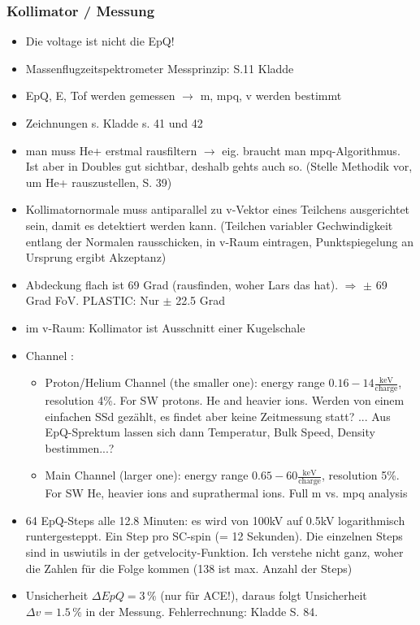 \documentclass[]{article}
\begin{document}
\subsubsection{Kollimator / Messung}
\begin{itemize}
	\item Die voltage ist nicht die EpQ!
	\item Massenflugzeitspektrometer Messprinzip: S.11 Kladde
	\item {EpQ, E, Tof} werden gemessen $\rightarrow$ {m, mpq, v} werden bestimmt
	\item Zeichnungen s. Kladde s. 41 und 42
	\item man muss He+ erstmal rausfiltern $\rightarrow$ eig. braucht man mpq-Algorithmus. Ist aber in Doubles gut sichtbar, deshalb gehts auch so. (Stelle Methodik vor, um He+ rauszustellen, S. 39)
	\item Kollimatornormale muss antiparallel zu v-Vektor eines Teilchens ausgerichtet sein, damit es detektiert werden kann. (Teilchen variabler Gechwindigkeit entlang der Normalen rausschicken, in v-Raum eintragen, Punktspiegelung an Ursprung ergibt Akzeptanz)
	\item Abdeckung flach ist 69 Grad (rausfinden, woher Lars das hat). $\Rightarrow$ $\pm$ 69 Grad FoV. PLASTIC: Nur $\pm$ 22.5 Grad
	\item im v-Raum: Kollimator ist Ausschnitt einer Kugelschale
	\item Channel \citep{gloeckler_1992}:
	\begin{itemize}
		\item Proton/Helium Channel (the smaller one): energy range $0.16 - 14 \frac{\mathrm{keV}}{\mathrm{charge}}$, resolution 4\%. For SW protons. He and heavier ions. Werden von einem einfachen SSd gezählt, es findet aber keine Zeitmessung statt? ... Aus EpQ-Sprektum lassen sich dann Temperatur, Bulk Speed, Density bestimmen...?
		\item Main Channel (larger one): energy range $0.65 - 60 \frac{\mathrm{keV}}{\mathrm{charge}}$, resolution 5\%. For SW He, heavier ions and suprathermal ions. Full m vs. mpq analysis
	\end{itemize}
	\item 64 EpQ-Steps alle 12.8 Minuten: es wird von 100kV auf 0.5kV logarithmisch runtergesteppt. Ein Step pro SC-spin (= 12 Sekunden). Die einzelnen Steps sind in uswiutils in der getvelocity-Funktion. Ich verstehe nicht ganz, woher die Zahlen für die Folge kommen (138 ist max. Anzahl der Steps)
	\item Unsicherheit $\Delta EpQ = 3\,\%$ (nur für ACE!), daraus folgt Unsicherheit $\Delta v = 1.5\,\%$ in der Messung. Fehlerrechnung: Kladde S. 84. \\ \\

\end{itemize}
\end{document}
